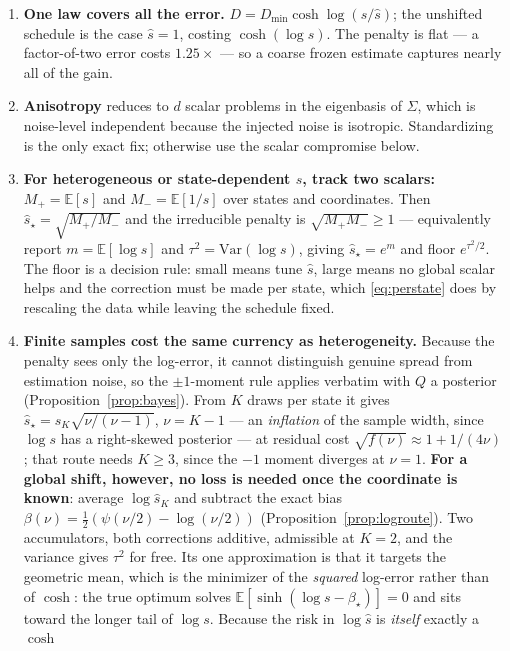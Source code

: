 \documentclass[11pt]{article}
\theoremstyle{definition}
\newcommand{\Var}{\mathrm{Var}}
\newcommand{\E}{\mathbb{E}}
\begin{document}
\begin{enumerate}
  which is why cosine's shape knobs cannot express it, and why implementing it
  directly is trivial.
  \item \textbf{One law covers all the error.} $D=D_{\min}\cosh\log(s/\hat s)$;
  the unshifted schedule is the case $\hat s=1$, costing $\cosh(\log s)$. The
  penalty is flat --- a factor-of-two error costs $1.25\times$ --- so a coarse
  frozen estimate captures nearly all of the gain.
  \item \textbf{Anisotropy} reduces to $d$ scalar problems in the eigenbasis of
  $\Sigma$, which is noise-level independent because the injected noise is
  isotropic. Standardizing is the only exact fix; otherwise use the scalar
  compromise below.
  \item \textbf{For heterogeneous or state-dependent $s$, track two scalars:}
  $M_+=\E[s]$ and $M_-=\E[1/s]$ over states and coordinates. Then
  $\hat s_\star=\sqrt{M_+/M_-}$ and the irreducible penalty is
  $\sqrt{M_+M_-}\ge1$ --- equivalently report $m=\E[\log s]$ and
  $\tau^2=\Var(\log s)$, giving $\hat s_\star=e^m$ and floor $e^{\tau^2/2}$. The
  floor is a decision rule: small means tune $\hat s$, large means no global
  scalar helps and the correction must be made per state, which
  \eqref{eq:perstate} does by rescaling the data while leaving the schedule fixed.
  \item \textbf{Finite samples cost the same currency as heterogeneity.} Because
  the penalty sees only the log-error, it cannot distinguish genuine spread from
  estimation noise, so the $\pm1$-moment rule applies verbatim with $Q$ a
  posterior (Proposition~\ref{prop:bayes}). From $K$ draws per state it gives
  $\hat s_\star=\hat s_K\sqrt{\nu/(\nu-1)}$, $\nu=K-1$ --- an \emph{inflation} of
  the sample width, since $\log s$ has a right-skewed posterior --- at residual
  cost $\sqrt{f(\nu)}\approx1+1/(4\nu)$; that route needs $K\ge3$, since the $-1$
  moment diverges at $\nu=1$. \textbf{For a global shift, however, no loss is
  needed once the coordinate is known}: average $\log\hat s_K$ and subtract the
  exact bias $\beta(\nu)=\tfrac12(\psi(\nu/2)-\log(\nu/2))$
  (Proposition~\ref{prop:logroute}). Two accumulators, both corrections additive,
  admissible at $K=2$, and the variance gives $\tau^2$ for free. Its one
  approximation is that it targets the geometric mean, which is the minimizer of
  the \emph{squared} log-error rather than of $\cosh$: the true optimum solves
  $\E[\sinh(\log s-\beta_\star)]=0$ and sits toward the longer tail of $\log s$.
  Because the risk in $\log\hat s$ is \emph{itself} exactly a $\cosh$

\end{enumerate}
\end{document}
